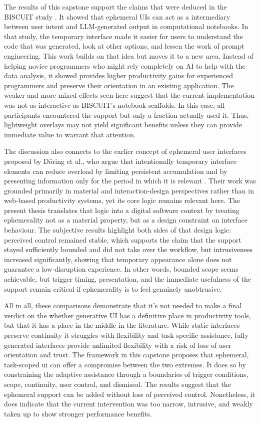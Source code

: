 The results of this capstone support the claims that were deduced in the BISCUIT study \parencite{Cheng2024Biscuit}. It showed that ephemeral UIs can act as a intermediary between user intent and LLM-generated output in computational notebooks. In that study, the temporary interface made it easier for users to understand the code that was generated, look at other options, and lessen the work of prompt engineering. This work builds on that idea but moves it to a new area. Instead of helping novice programmers who might rely completely on AI to help with the data analysis, it showed provides higher productivity gains for experienced programmers and preserve their orientation in an existing application. The weaker and more mixed effects seen here suggest that the current implementation was not as interactive as BISCUIT's notebook scaffolds. In this case, all participants encountered the support but only a fraction actually used it. Thus, lightweight overlays may not yield significant benefits unless they can provide immediate value to warrant that attention.

The discussion also connects to the earlier concept of ephemeral user interfaces proposed by D\"oring et al., who argue that intentionally temporary interface elements can reduce overload by limiting persistent accumulation and by presenting information only for the period in which it is relevant \parencite{Doring2013EphemeralUI}. Their work was grounded primarily in material and interaction-design perspectives rather than in web-based productivity systems, yet its core logic remains relevant here. The present thesis translates that logic into a digital software context by treating ephemerality not as a material property, but as a design constraint on interface behaviour. The subjective results highlight both sides of that design logic: perceived control remained stable, which supports the claim that the support stayed sufficiently bounded and did not take over the workflow, but intrusiveness increased significantly, showing that temporary appearance alone does not guarantee a low-disruption experience. In other words, bounded scope seems achievable, but trigger timing, presentation, and the immediate usefulness of the support remain critical if ephemerality is to feel genuinely unobtrusive.

All in all, these comparisons demonstrate that it's not needed to make a final verdict on the whether generative UI has a definitive place in productivity tools, but that it has a place in the middle in the literature. While static interfaces preserve continuity it struggles with flexibility and task specific assistance, fully generated interfaces provide unlimited flexibility with a risk of loss of user orientation and trust. The framework in this capstone proposes that ephemeral, task-scoped ui can offer a compromise between the two extremes. It does so by constraining the adaptive assistance through a boundaries of trigger conditions, scope, continuity, user control, and dismissal. The results suggest that the ephemeral support can be added without loss of perceived control. Nonetheless, it does indicate that the current intervention was too narrow, intrusive, and weakly taken up to show stronger performance benefits.

